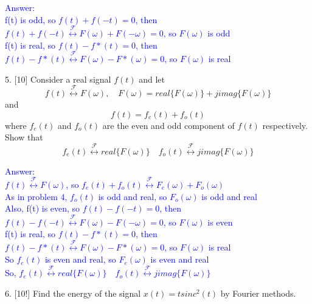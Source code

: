 \documentclass[12pt,a4paper]{article}
\begin{document}
\begin{tcolorbox}
\normalsize
\textcolor{blue}{Answer:\\
f(t) is odd, so $f(t)+f(-t)=0$, then $f(t)+f(-t) \stackrel{\mathcal{F}}{\longleftrightarrow} F(\omega)+F(-\omega)=0$, so $F(\omega)$ is odd\\
f(t) is real, so $f(t)-f*(t)=0$, then $f(t)-f*(t) \stackrel{\mathcal{F}}{\longleftrightarrow} F(\omega)-F*(\omega)=0$, so $F(\omega)$ is real
}
\end{tcolorbox}


\begin{tcolorbox}[colback = white]
5. [10] Consider a real signal $f(t)$ and let
$$
f(t) \stackrel{\mathcal{F}}{\leftrightarrow} F(\omega), \quad F(\omega)={real}\{F(\omega)\}+j {imag}\{F(\omega)\}
$$
and
$$
f(t)=f_{e}(t)+f_{o}(t)
$$
where $f_{e}(t)$ and $f_{o}(t)$ are the even and odd component of $f(t)$ respectively. Show that
$$
f_{e}(t) \stackrel{\mathcal{F}}{\leftrightarrow} {real}\{F(\omega)\} \quad f_{o}(t) \stackrel{\mathcal{F}}{\longleftrightarrow} j {imag}\{F(\omega)\}
$$
\end{tcolorbox}

\begin{tcolorbox}
\normalsize
\textcolor{blue}{Answer:\\
$f(t)\stackrel{\mathcal{F}}{\longleftrightarrow} F(\omega)$, so $f_e(t)+f_o(t)\stackrel{\mathcal{F}}{\longleftrightarrow} F_e(\omega)+F_o(\omega)$\\
As in problem 4, $f_o(t)$ is odd and real, so $F_o(\omega)$ is odd and real\\
Also, f(t) is even, so $f(t)-f(-t)=0$, then $f(t)-f(-t) \stackrel{\mathcal{F}}{\longleftrightarrow} F(\omega)-F(-\omega)=0$, so $F(\omega)$ is even\\
f(t) is real, so $f(t)-f*(t)=0$, then $f(t)-f*(t) \stackrel{\mathcal{F}}{\longleftrightarrow} F(\omega)-F*(\omega)=0$, so $F(\omega)$ is real\\
So $f_e(t)$ is even and real, so $F_e(\omega)$ is even and real\\
So, $f_{e}(t) \stackrel{\mathcal{F}}{\leftrightarrow} {real}\{F(\omega)\} \quad f_{o}(t) \stackrel{\mathcal{F}}{\longleftrightarrow} j {imag}\{F(\omega)\}$
}
\end{tcolorbox}


\begin{tcolorbox}[colback = white]
6. [10!] Find the energy of the signal $x(t)=t {sinc}^{2}(t)$ by Fourier methods.
\end{tcolorbox}
\end{document}
